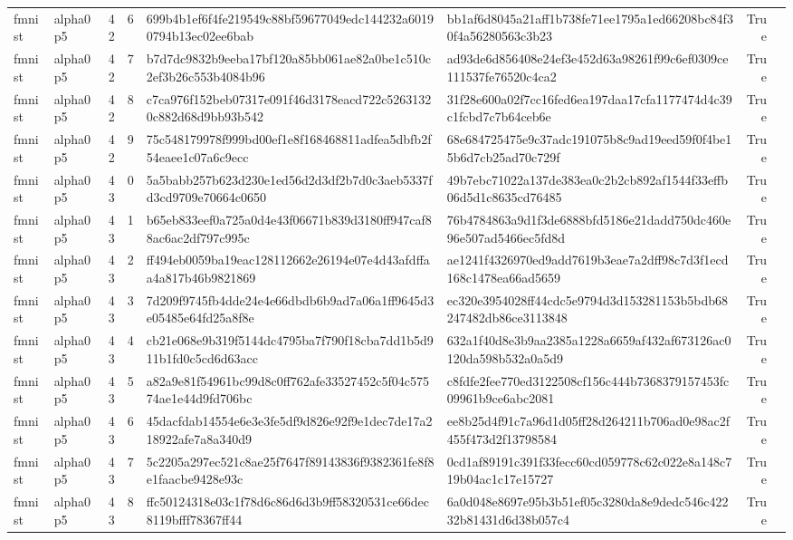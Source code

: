 \begin{tabular}{llrrllrl}
fmnist & alpha0p5 & 42 & 6 & 699b4b1ef6f4fe219549c88bf59677049edc144232a60190794b13ec02ee6bab & bb1af6d8045a21aff1b738fe71ee1795a1ed66208bc84f30f4a56280563c3b23 & True &  \\
fmnist & alpha0p5 & 42 & 7 & b7d7dc9832b9eeba17bf120a85bb061ae82a0be1c510c2ef3b26c553b4084b96 & ad93de6d856408e24ef3e452d63a98261f99c6ef0309ce111537fe76520c4ca2 & True &  \\
fmnist & alpha0p5 & 42 & 8 & c7ca976f152beb07317e091f46d3178eacd722c52631320c882d68d9bb93b542 & 31f28e600a02f7cc16fed6ea197daa17cfa1177474d4c39c1fcbd7c7b64ceb6e & True &  \\
fmnist & alpha0p5 & 42 & 9 & 75c548179978f999bd00ef1e8f168468811adfea5dbfb2f54eaee1c07a6c9ecc & 68e684725475e9c37adc191075b8c9ad19eed59f0f4be15b6d7cb25ad70c729f & True &  \\
fmnist & alpha0p5 & 43 & 0 & 5a5babb257b623d230e1ed56d2d3df2b7d0c3aeb5337fd3cd9709e70664c0650 & 49b7ebc71022a137de383ea0c2b2cb892af1544f33effb06d5d1c8635cd76485 & True &  \\
fmnist & alpha0p5 & 43 & 1 & b65eb833eef0a725a0d4e43f06671b839d3180ff947caf88ac6ac2df797c995c & 76b4784863a9d1f3de6888bfd5186e21dadd750dc460e96e507ad5466ec5fd8d & True &  \\
fmnist & alpha0p5 & 43 & 2 & ff494eb0059ba19eac128112662e26194e07e4d43afdffaa4a817b46b9821869 & ae1241f4326970ed9add7619b3eae7a2dff98c7d3f1ecd168c1478ea66ad5659 & True &  \\
fmnist & alpha0p5 & 43 & 3 & 7d209f9745fb4dde24e4e66dbdb6b9ad7a06a1ff9645d3e05485e64fd25a8f8e & ec320e3954028ff44cdc5e9794d3d153281153b5bdb68247482db86ce3113848 & True &  \\
fmnist & alpha0p5 & 43 & 4 & cb21e068e9b319f5144dc4795ba7f790f18cba7dd1b5d911b1fd0c5cd6d63acc & 632a1f40d8e3b9aa2385a1228a6659af432af673126ac0120da598b532a0a5d9 & True &  \\
fmnist & alpha0p5 & 43 & 5 & a82a9e81f54961bc99d8c0ff762afe33527452c5f04c57574ae1e44d9fd706bc & c8fdfe2fee770ed3122508cf156c444b7368379157453fc09961b9ce6abc2081 & True &  \\
fmnist & alpha0p5 & 43 & 6 & 45dacfdab14554e6e3e3fe5df9d826e92f9e1dec7de17a218922afe7a8a340d9 & ee8b25d4f91c7a96d1d05ff28d264211b706ad0e98ac2f455f473d2f13798584 & True &  \\
fmnist & alpha0p5 & 43 & 7 & 5c2205a297ec521c8ae25f7647f89143836f9382361fe8f8e1faacbe9428e93c & 0cd1af89191c391f33fecc60cd059778c62c022e8a148c719b04ac1c17e15727 & True &  \\
fmnist & alpha0p5 & 43 & 8 & ffc50124318e03c1f78d6c86d6d3b9ff58320531ce66dec8119bfff78367ff44 & 6a0d048e8697e95b3b51ef05c3280da8e9dedc546c42232b81431d6d38b057c4 & True &  \\

\end{tabular}
